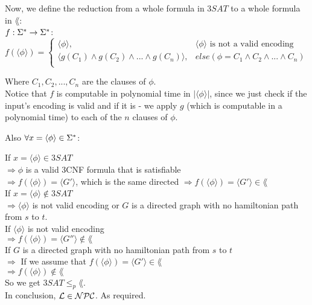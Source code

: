 Now, we define the reduction from a whole formula in $3SAT$ to a whole formula in $\lang$: \\
$f: \Sigma^* \rightarrow \Sigma^*$: \\
$
    f(\langle \phi \rangle) =
    \begin{cases}
        \langle \phi  \rangle,                                         & \langle \phi \rangle \text{ is not a valid encoding } \\
        \langle g(C_1) \wedge g(C_2) \wedge ... \wedge g(C_n) \rangle, & else (\phi = C_1 \wedge C_2 \wedge ... \wedge C_n)    \\
    \end{cases}
$

Where $C_1, C_2,...,C_n$ are the clauses of $\phi$. \\
Notice that $f$ is computable in polynomial time in $|\langle \phi \rangle|$, since we just check
if the input's encoding is valid and if it is - we apply $g$ (which is computable in a polynomial time) to each of the $n$ clauses of $\phi$.

Also $\forall x = \langle \phi \rangle \in \Sigma^*$:







If $x = \langle \phi \rangle \in 3SAT$ \\
$\Rightarrow \phi$ is a valid 3CNF formula that is satisfiable \\
$\Rightarrow f(\langle \phi \rangle) = \langle G' \rangle$, which is the same directed
$\Rightarrow f(\langle \phi \rangle) = \langle G' \rangle \in \lang$ \\

If $x = \langle  \phi \rangle \notin 3SAT$ \\
$\Rightarrow \langle  \phi \rangle$ is not valid encoding or $G$ is a directed graph with no hamiltonian path from $s$ to $t$. \\
If $\langle  \phi \rangle$ is not valid encoding \\
$\Rightarrow f(\langle \phi \rangle) = \langle G'' \rangle \notin \lang$ \\
If $G$ is a directed graph with no hamiltonian path from $s$ to $t$ \\
$\Rightarrow $ If we assume that $f(\langle  \phi \rangle) = \langle G' \rangle \in \lang$ \\

$\Rightarrow f(\langle \phi \rangle) \notin \lang$ \\

So we get \underline{$3SAT \leq_p \lang$}. \\
In conclusion, $\mathcal{L} \in \mathcal{N}\mathcal{P}\mathcal{C}$. As required.

